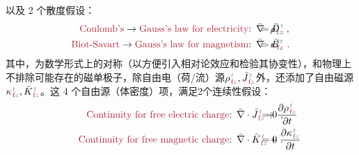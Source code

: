 以及 2 个散度假设：
\begin{subequations} \label{eq:div-db}
\begin{align}
	\textcolor{Maroon}{\text{Coulomb's}} \to \textcolor{Maroon}{\text{Gauss's law for electricity}}\text{:}&\hspace{0.5em} \bar{\nabla} \cdot \bar{D}^{\;\!\textcolor{gray}{t}}_{\;\!\textcolor{gray}{z}} \hspace{-3.8em} &&= {\rho}^{\;\!\textcolor{gray}{t}}_{\;\!\textcolor{Maroon}{\text{f}}\textcolor{gray}{z}}~, \label{eq:div-d} \\ \textcolor{Maroon}{\text{Biot-Savart}} \to \textcolor{Maroon}{\text{Gauss's law for magnetism}}\text{:}&\hspace{0.5em} \bar{\nabla} \cdot \bar{B}^{\;\!\textcolor{gray}{t}}_{\;\!\textcolor{gray}{z}} \hspace{-3.8em} &&= {\kappa}^{\;\!\textcolor{gray}{t}}_{\;\!\textcolor{Maroon}{\text{f}}\textcolor{gray}{z}}~. \label{eq:div-b}
\end{align}
\end{subequations}
其中，为数学形式上的对称（以方便引入相对论效应和检验其协变性\cite{lakhtakiaCovariancesInvariancesMaxwell1995,chen-zhuChenZhuxieUndergraduate_courses2024}），和物理上不排除可能存在的磁单极子，除自由电（荷/流）源${\rho}^{\;\!\textcolor{gray}{t}}_{\;\!\textcolor{Maroon}{\text{f}}\textcolor{gray}{z}}, \bar{J}^{\;\!\textcolor{gray}{t}}_{\;\!\textcolor{Maroon}{\text{f}}\textcolor{gray}{z}}$外，还添加了自由磁源${\kappa}^{\;\!\textcolor{gray}{t}}_{\;\!\textcolor{Maroon}{\text{f}}\textcolor{gray}{z}}, \bar{K}^{\;\!\textcolor{gray}{t}}_{\;\!\textcolor{Maroon}{\text{f}}\textcolor{gray}{z}}$\cite{lakhtakiaCovariancesInvariancesMaxwell1995}。这 4 个自由源（体密度）项，满足2个连续性假设\cite{mackayElectromagneticAnisotropyBianisotropy2019,lakhtakiaCovariancesInvariancesMaxwell1995,chen-zhuChenZhuxieUndergraduate_courses2024}：
\begin{subequations} \label{eq:div-em-f}
\begin{align}
	\textcolor{Maroon}{\text{Continuity for free electric charge}}\text{:}&\hspace{0.5em} \bar{\nabla} \cdot \bar{J}^{\;\!\textcolor{gray}{t}}_{\;\!\textcolor{Maroon}{\text{f}}\textcolor{gray}{z}} + \frac{\partial {\rho}^{\;\!\textcolor{gray}{t}}_{\;\!\textcolor{Maroon}{\text{f}}\textcolor{gray}{z}}}{\partial t} \hspace{-5.3em} &&= 0~, \label{eq:div-e-f} \\ \textcolor{Maroon}{\text{Continuity for free magnetic charge}}\text{:}&\hspace{0.5em} \bar{\nabla} \cdot \bar{K}^{\;\!\textcolor{gray}{t}}_{\;\!\textcolor{Maroon}{\text{f}}\textcolor{gray}{z}} + \frac{\partial {\kappa}^{\;\!\textcolor{gray}{t}}_{\;\!\textcolor{Maroon}{\text{f}}\textcolor{gray}{z}}}{\partial t} \hspace{-5.3em} &&= 0~. \label{eq:div-m-f}
\end{align}
\end{subequations}
